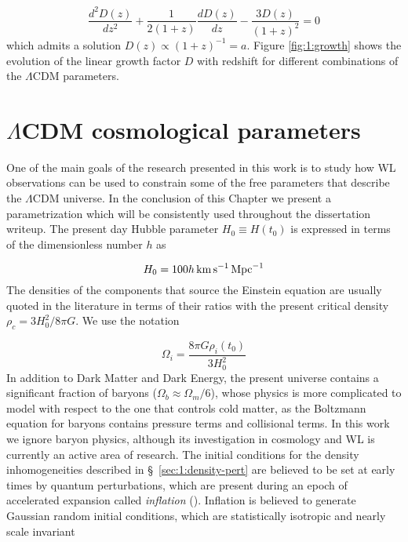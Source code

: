 \begin{equation}
\label{eq:1:growth-diff-cold}
\frac{d^2D(z)}{dz^2} + \frac{1}{2(1+z)}\frac{dD(z)}{dz}-\frac{3D(z)}{(1+z)^2} = 0
\end{equation}
% 
which admits a solution $D(z)\propto (1+z)^{-1}=a$. Figure \ref{fig:1:growth} shows the evolution of the linear growth factor $D$ with redshift for different combinations of the $\Lambda$CDM parameters. 


\section{$\Lambda$CDM cosmological parameters}
One of the main goals of the research presented in this work is to study how WL observations can be used to constrain some of the free parameters that describe the $\Lambda$CDM universe. In the conclusion of this Chapter we present a parametrization which will be consistently used throughout the dissertation writeup. The present day Hubble parameter $H_0\equiv H(t_0)$ is expressed in terms of the dimensionless number $h$ as

\begin{equation}
\label{eq:1:hubble-present}
H_0 = 100h\,{\rm km}\,{\rm s}^{-1}\,{\rm Mpc}^{-1}
\end{equation} 
%
The densities of the components that source the Einstein equation are usually quoted in the literature in terms of their ratios with the present critical density $\rho_c=3H_0^2/8\pi G$. We use the notation

\begin{equation}
\label{eq:1:omega-def}
\Omega_i = \frac{8\pi G\rho_i(t_0)}{3H_0^2}
\end{equation}
%
In addition to Dark Matter and Dark Energy, the present universe contains a significant fraction of baryons ($\Omega_b\approx \Omega_m/6$), whose physics is more complicated to model with respect to the one that controls cold matter, as the Boltzmann equation for baryons contains pressure terms and collisional terms. In this work we ignore baryon physics, although its investigation in cosmology and WL is currently an active area of research. The initial conditions for the density inhomogeneities described in \S~\ref{sec:1:density-pert} are believed to be set at early times by quantum perturbations, which are present during an epoch of accelerated expansion called \textit{inflation} (\citep{Inflation}). Inflation is believed to generate Gaussian random initial conditions, which are statistically isotropic and nearly scale invariant 

